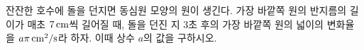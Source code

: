 잔잔한 호수에 돌을 던지면 동심원 모양의 원이 생긴다. 가장 바깥쪽 원의 반지름의 길이가 매초 $7\mkern3mu \mathrm{cm}$씩 길어질 때, 돌을 던진 지 $3$초 후의 가장 바깥쪽 원의 넓이의 변화율을 $a\pi\mkern3mu \mathrm{cm}^2/\mathrm{s}$라 하자. 이때 상수 $a$의 값을 구하시오.
